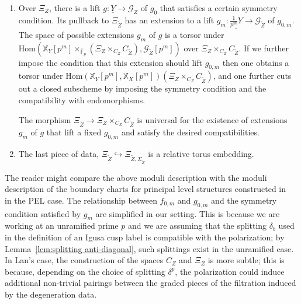 \documentclass[letterpaper,11pt]{amsart}
\begin{document}
\begin{enumerate}
The morphism $C_{\widetilde{Z}}\to C_Z\times_{\mathscr{C}_Z}\mathrm{Ig}^b_{\widetilde{Z}}$ is universal for the existence of splittings $\beta_m$ or equivalently extensions $g_{0,m}$ of $g_0$.  

\item Over $\Xi_Z$, there is a lift $g:\underline{Y}\to \mathcal{G}_{Z}$ of $g_0$ that satisfies a certain symmetry condition. Its pullback to $\Xi_{\widetilde{Z}}$ has an extension to a lift $g_m:\underline{\frac{1}{p^m} Y}\to \mathcal{G}_{\widetilde{Z}}$ of $g_{0,m}$. The space of possible extensions $g_m$ of $g$ is a torsor under 
$\mathrm{Hom}\left(\mathbb{X}_Y[p^m]\times_{\overline{\mathbb{F}}_p}\left(\Xi_Z\times_{C_Z} C_{\widetilde{Z}}\right),\mathcal{G}_{\widetilde{Z}}[p^m]\right)$ over $\Xi_Z\times_{C_Z} C_{\widetilde{Z}}$. If we further impose the condition that this extension should lift $g_{0,m}$ then one obtains a torsor under $\mathrm{Hom}\left(\mathbb{X}_Y[p^m],\mathbb{X}_X[p^m]\right)(\Xi_Z\times_{C_Z}C_{\widetilde{Z}})$, and one further cuts out a closed subscheme by imposing the symmetry condition and the compatibility with endomorphisms. 

The morphism $\Xi_{\widetilde{Z}}\to \Xi_{Z}\times_{C_Z}C_{\widetilde{Z}}$ is universal for the existence of extensions $g_m$ of $g$ that lift a fixed $g_{0,m}$ and satisfy the desired compatibilities. 

\item The last piece of data, $\Xi_{\widetilde{Z}}\hookrightarrow \Xi_{\widetilde{Z},\Sigma_{\widetilde{Z}}}$ is a relative torus embedding. 
 \end{enumerate}

 \begin{remark}\label{rem:comparison with Lan}
     The reader might compare the above moduli description with the moduli description of the boundary charts for principal level structures constructed in~\cite[\S 6.2.3]{lan-thesis} in the PEL case. The relationship between $f_{0,m}$ and $g_{0,m}$ and the symmetry condition satisfied by $g_m$ are simplified in our setting. This is because we are working at an unramified prime $p$ and we are assuming that the splitting $\delta_b$ used in the definition of an Igusa cusp label is compatible with the polarization; by Lemma~\ref{lem:splitting anti-diagonal}, such splittings exist in the unramified case. In Lan's case, the construction of the spaces $C_Z$ and $\Xi_Z$ is more subtle; this is because, depending on the choice of splitting $\delta^p$, the polarization could induce additional non-trivial pairings between the graded pieces of the filtration induced by the degeneration data. 
 \end{remark}
\end{document}
